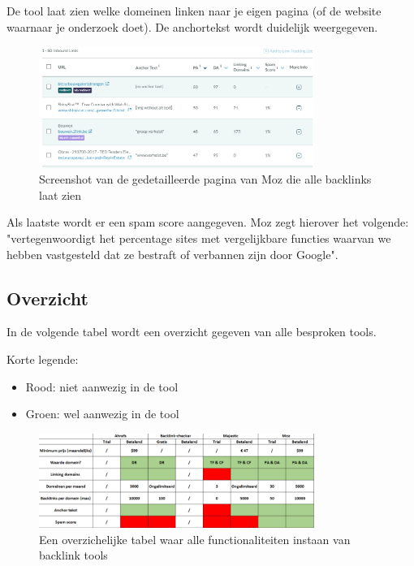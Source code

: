De tool laat zien welke domeinen linken naar je eigen pagina (of de website waarnaar je onderzoek doet). De anchortekst wordt duidelijk weergegeven. 

\begin{figure}[h!]
\centering
\includegraphics[width=0.8\textwidth]{img/mozbacklinks.PNG}
\caption{Screenshot van de gedetailleerde pagina van Moz die alle backlinks laat zien
\autocite{moz}}
\end{figure}

Als laatste wordt er een spam score aangegeven. Moz zegt hierover het volgende: "vertegenwoordigt het percentage sites met vergelijkbare functies waarvan we hebben vastgesteld dat ze bestraft of verbannen zijn door Google".

\subsection{Overzicht}
\label{ch: Overzicht}

In de volgende tabel wordt een overzicht gegeven van alle besproken tools. 

Korte legende: 
\begin{itemize}
\item Rood: niet aanwezig in de tool
\item Groen: wel aanwezig in de tool
\end{itemize}

\begin{figure}[h!]
\centering
\includegraphics[width=0.8\textwidth]{img/linkbuildingtabel.PNG}
\caption{Een overzichelijke tabel waar alle functionaliteiten instaan van backlink tools}
\end{figure}

